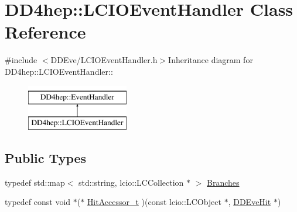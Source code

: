 \hypertarget{class_d_d4hep_1_1_l_c_i_o_event_handler}{
\section{DD4hep::LCIOEventHandler Class Reference}
\label{class_d_d4hep_1_1_l_c_i_o_event_handler}
}


{\ttfamily \#include $<$DDEve/LCIOEventHandler.h$>$}Inheritance diagram for DD4hep::LCIOEventHandler::\begin{figure}[H]
\begin{center}
\leavevmode
\includegraphics[height=2cm]{class_d_d4hep_1_1_l_c_i_o_event_handler}
\end{center}
\end{figure}
\subsection*{Public Types}
\begin{DoxyCompactItemize}
\item 
typedef std::map$<$ std::string, lcio::LCCollection $\ast$ $>$ \hyperlink{class_d_d4hep_1_1_l_c_i_o_event_handler_abb97052600fb229e9fdc6cfeefdc4177}{Branches}
\item 
typedef const void $\ast$($\ast$ \hyperlink{class_d_d4hep_1_1_l_c_i_o_event_handler_a45f21e8a77b574e7332b5b6f2861ea1b}{HitAccessor\_\-t} )(const lcio::LCObject $\ast$, \hyperlink{class_d_d4hep_1_1_d_d_eve_hit}{DDEveHit} $\ast$)
\end{DoxyCompactItemize}
